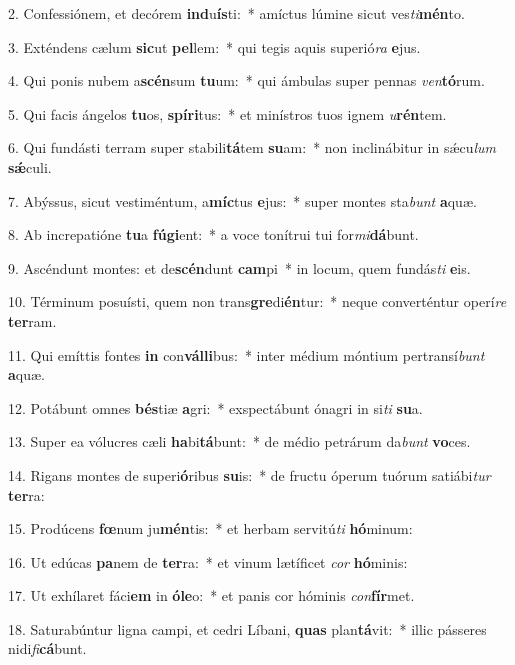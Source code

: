 2. Confessiónem, et decórem \textbf{ind}u\textbf{ís}ti:~*  amíctus lúmine sicut ves\textit{ti}\textbf{mén}to.\

3. Exténdens cælum \textbf{sic}ut \textbf{pel}lem:~*  qui tegis aquis superió\textit{ra} \textbf{e}jus.\

4. Qui ponis nubem a\textbf{scén}sum \textbf{tu}um:~*  qui ámbulas super pennas \textit{ven}\textbf{tó}rum.\

5. Qui facis ángelos \textbf{tu}os, \textbf{spí}\textbf{ri}tus:~*  et minístros tuos ignem \textit{u}\textbf{rén}tem.\

6. Qui fundásti terram super stabili\textbf{tá}tem \textbf{su}am:~*  non inclinábitur in sǽcu\textit{lum} \textbf{sǽ}culi.\

7. Abýssus, sicut vestiméntum, a\textbf{míc}tus \textbf{e}jus:~*  super montes sta\textit{bunt} \textbf{a}quæ.\

8. Ab increpatióne \textbf{tu}a \textbf{fú}\textbf{gi}ent:~*  a voce tonítrui tui for\textit{mi}\textbf{dá}bunt.\

9. Ascéndunt montes: et de\textbf{scén}dunt \textbf{cam}pi~*  in locum, quem fundás\textit{ti} \textbf{e}is.\

10. Términum posuísti, quem non trans\textbf{gre}di\textbf{én}tur:~*  neque converténtur operí\textit{re} \textbf{ter}ram.\

11. Qui emíttis fontes \textbf{in} con\textbf{vál}\textbf{li}bus:~*  inter médium móntium pertransí\textit{bunt} \textbf{a}quæ.\

12. Potábunt omnes \textbf{bés}tiæ \textbf{a}gri:~*  exspectábunt ónagri in si\textit{ti} \textbf{su}a.\

13. Super ea vólucres cæli \textbf{ha}bi\textbf{tá}bunt:~*  de médio petrárum da\textit{bunt} \textbf{vo}ces.\

14. Rigans montes de superi\textbf{ó}ribus \textbf{su}is:~*  de fructu óperum tuórum satiábi\textit{tur} \textbf{ter}ra:\

15. Prodúcens \textbf{fœ}num ju\textbf{mén}tis:~*  et herbam servitú\textit{ti} \textbf{hó}minum:\

16. Ut edúcas \textbf{pa}nem de \textbf{ter}ra:~*  et vinum lætíficet \textit{cor} \textbf{hó}minis:\

17. Ut exhílaret fáci\textbf{em} in \textbf{ó}\textbf{le}o:~*  et panis cor hóminis \textit{con}\textbf{fír}met.\

18. Saturabúntur ligna campi, et cedri Líbani, \textbf{quas} plan\textbf{tá}vit:~*  illic pásseres nidi\textit{fi}\textbf{cá}bunt.\

